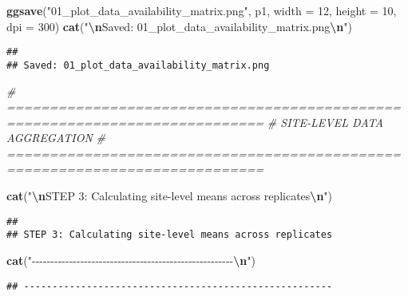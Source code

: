 \documentclass[
]{article}
\newenvironment{Shaded}{\begin{snugshade}}{\end{snugshade}}
\newcommand{\AttributeTok}[1]{\textcolor[rgb]{0.13,0.29,0.53}{#1}}
\newcommand{\CommentTok}[1]{\textcolor[rgb]{0.56,0.35,0.01}{\textit{#1}}}
\newcommand{\DecValTok}[1]{\textcolor[rgb]{0.00,0.00,0.81}{#1}}
\newcommand{\FunctionTok}[1]{\textcolor[rgb]{0.13,0.29,0.53}{\textbf{#1}}}
\newcommand{\NormalTok}[1]{#1}
\newcommand{\SpecialCharTok}[1]{\textcolor[rgb]{0.81,0.36,0.00}{\textbf{#1}}}
\newcommand{\StringTok}[1]{\textcolor[rgb]{0.31,0.60,0.02}{#1}}
\begin{document}
\begin{Shaded}
\begin{Highlighting}[]
\FunctionTok{ggsave}\NormalTok{(}\StringTok{"01\_plot\_data\_availability\_matrix.png"}\NormalTok{, p1, }\AttributeTok{width =} \DecValTok{12}\NormalTok{, }\AttributeTok{height =} \DecValTok{10}\NormalTok{, }\AttributeTok{dpi =} \DecValTok{300}\NormalTok{)}
\FunctionTok{cat}\NormalTok{(}\StringTok{"}\SpecialCharTok{\textbackslash{}n}\StringTok{Saved: 01\_plot\_data\_availability\_matrix.png}\SpecialCharTok{\textbackslash{}n}\StringTok{"}\NormalTok{)}
\end{Highlighting}
\end{Shaded}

\begin{verbatim}
## 
## Saved: 01_plot_data_availability_matrix.png
\end{verbatim}

\begin{Shaded}
\begin{Highlighting}[]
\CommentTok{\# ============================================================================}
\CommentTok{\# SITE{-}LEVEL DATA AGGREGATION}
\CommentTok{\# ============================================================================}

\FunctionTok{cat}\NormalTok{(}\StringTok{"}\SpecialCharTok{\textbackslash{}n}\StringTok{STEP 3: Calculating site{-}level means across replicates}\SpecialCharTok{\textbackslash{}n}\StringTok{"}\NormalTok{)}
\end{Highlighting}
\end{Shaded}

\begin{verbatim}
## 
## STEP 3: Calculating site-level means across replicates
\end{verbatim}

\begin{Shaded}
\begin{Highlighting}[]
\FunctionTok{cat}\NormalTok{(}\StringTok{"{-}{-}{-}{-}{-}{-}{-}{-}{-}{-}{-}{-}{-}{-}{-}{-}{-}{-}{-}{-}{-}{-}{-}{-}{-}{-}{-}{-}{-}{-}{-}{-}{-}{-}{-}{-}{-}{-}{-}{-}{-}{-}{-}{-}{-}{-}{-}{-}{-}{-}{-}{-}{-}{-}}\SpecialCharTok{\textbackslash{}n}\StringTok{"}\NormalTok{)}
\end{Highlighting}
\end{Shaded}

\begin{verbatim}
## ------------------------------------------------------
\end{verbatim}
\end{document}
